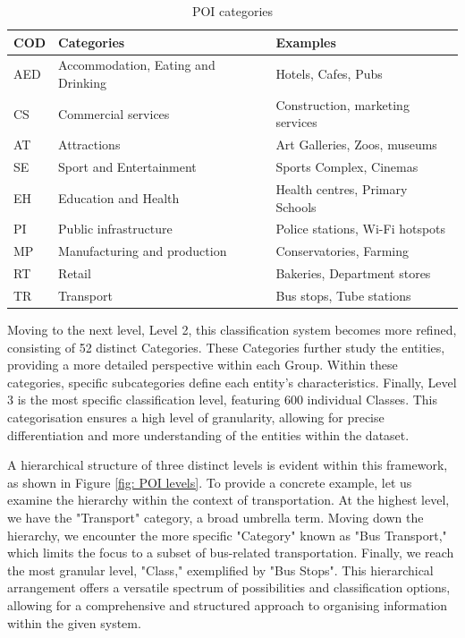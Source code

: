         \begin{table}[H]
\centering
\begin{tabular}{@{}lll@{}}
\toprule
\textbf{COD} & \textbf{Categories} & \textbf{Examples} \\ \midrule
AED & Accommodation, Eating and Drinking & Hotels, Cafes, Pubs \\
CS & Commercial services & Construction, marketing services \\
AT & Attractions & Art Galleries, Zoos, museums  \\
SE & Sport and Entertainment & Sports Complex, Cinemas \\
EH & Education and Health & Health centres, Primary Schools \\
PI & Public infrastructure & Police stations, Wi-Fi hotspots \\
MP & Manufacturing and production &  Conservatories, Farming \\
RT &  Retail & Bakeries, Department stores \\
TR & Transport & Bus stops, Tube stations \\ \bottomrule
\end{tabular}
    \caption{POI categories}
    \label{table: POIs_groups}
\end{table}
        
        Moving to the next level, Level 2, this classification system becomes more refined, consisting of 52 distinct Categories. These Categories further study the entities, providing a more detailed perspective within each Group. Within these categories, specific subcategories define each entity's characteristics. Finally, Level 3 is the most specific classification level, featuring 600 individual Classes. This categorisation ensures a high level of granularity, allowing for precise differentiation and more understanding of the entities within the dataset.

        A hierarchical structure of three distinct levels is evident within this framework\citep{osPointsInterestProduct2022}, as shown in Figure \ref{fig: POI levels}. To provide a concrete example, let us examine the hierarchy within the context of transportation. At the highest level, we have the "Transport" category, a broad umbrella term. Moving down the hierarchy, we encounter the more specific "Category" known as "Bus Transport," which limits the focus to a subset of bus-related transportation. Finally, we reach the most granular level, "Class," exemplified by "Bus Stops". This hierarchical arrangement offers a versatile spectrum of possibilities and classification options, allowing for a comprehensive and structured approach to organising information within the given system.

